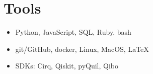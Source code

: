 \documentclass{cultvoucher}
\begin{document}
\section{Tools}
\begin{itemize}
	\item Python, JavaScript, SQL, Ruby, bash
\end{itemize}
\begin{itemize}
	\item git/GitHub, docker, Linux, MacOS, \LaTeX{}
\end{itemize}
\begin{itemize}
	\item SDKs: Cirq, Qiskit, pyQuil, Qibo
\end{itemize}
\end{document}
